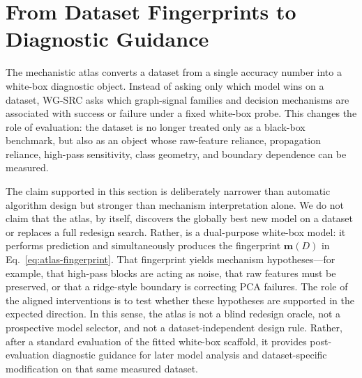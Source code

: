\section{From Dataset Fingerprints to Diagnostic Guidance}

\label{sec:atlas-diagnostic-probe}

The mechanistic atlas converts a dataset from a single accuracy number into a
white-box diagnostic object. Instead of asking only which model wins on a
dataset, WG-SRC asks which graph-signal families and decision mechanisms are
associated with success or failure under a fixed white-box probe. This changes
the role of evaluation: the dataset is no longer treated only as a black-box
benchmark, but also as an object whose raw-feature reliance, propagation
reliance, high-pass sensitivity, class geometry, and boundary dependence can be
measured.

The claim supported in this section is deliberately narrower than automatic
algorithm design but stronger than mechanism interpretation alone. We do not
claim that the atlas, by itself, discovers the globally best new model on a
dataset or replaces a full redesign search. Rather, \SRC{} is a dual-purpose
white-box model: it performs prediction and simultaneously produces the
fingerprint $\mathbf{m}(D)$ in Eq.~\eqref{eq:atlas-fingerprint}. That
fingerprint yields mechanism hypotheses---for example, that high-pass blocks
are acting as noise, that raw features must be preserved, or that a
ridge-style boundary is correcting PCA failures. The role of the aligned interventions is to test whether these hypotheses are
supported in the expected direction. In this sense, the atlas is not a blind
redesign oracle, not a prospective model selector, and not a
dataset-independent design rule. Rather, after a standard evaluation of the
fitted white-box scaffold, it provides post-evaluation diagnostic guidance for
later model analysis and dataset-specific modification on that same measured
dataset.


